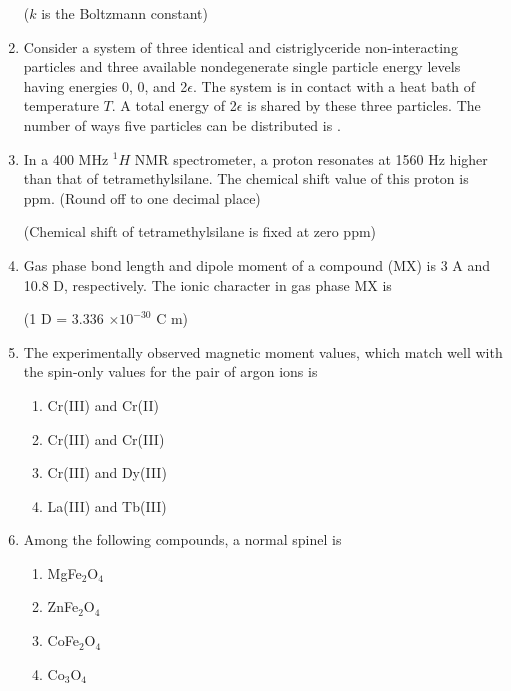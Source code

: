 \documentclass[journal,12pt,onecolumn]{IEEEtran}
\theoremstyle{remark}
\begin{document}
\begin{enumerate}
(\(k\) is the Boltzmann constant) \hfill{}

\item Consider a system of three identical and cistriglyceride non-interacting particles and three available nondegenerate single particle energy levels having energies 0, 0, and 2\(\epsilon\). The system is in contact with a heat bath of temperature \(T\). A total energy of 2\(\epsilon\) is shared by these three particles. The number of ways five particles can be distributed is . \hfill{}

\item In a 400 MHz \(^1H\) NMR spectrometer, a proton resonates at 1560 Hz higher than that of tetramethylsilane. The chemical shift value of this proton is  ppm. (Round off to one decimal place)

(Chemical shift of tetramethylsilane is fixed at zero ppm) \hfill{}

\item Gas phase bond length and dipole moment of a compound (MX) is 3 A and 10.8 D, respectively. The ionic character in gas phase MX is  %

(1 D = 3.336 \(\times 10^{-30}\) C m) \hfill{}





\item The experimentally observed magnetic moment values, which match well with the spin-only values for the pair of argon ions is \hfill{}
\begin{multicols}{2}
\begin{enumerate}
\item  Cr(III) and Cr(II)
\item  Cr(III) and Cr(III)
\item  Cr(III) and Dy(III)
\item  La(III) and Tb(III)
\end{enumerate}
\end{multicols}

\item Among the following compounds, a normal spinel is \hfill{}
\begin{multicols}{4}
\begin{enumerate}
\item  MgFe\(_2\)O\(_4\)
\item  ZnFe\(_2\)O\(_4\)
\item  CoFe\(_2\)O\(_4\)
\item  Co\(_3\)O\(_4\)
\end{enumerate}
\end{multicols}


\end{enumerate}
\end{document}
